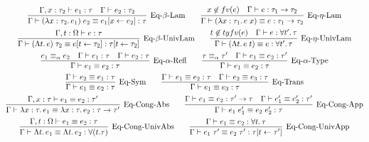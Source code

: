 \begin{gather*}
  \infer[\text{Eq-$\beta$-Lam}]{\Gamma \vdash (\lambda x: \tau_2\ldotp e_1)\; e_2 \equiv e_1[x \assign e_2]: \tau}{
    \Gamma, x: \tau_2 \vdash e_1: \tau
    &
    \Gamma \vdash e_2: \tau_2
  }
  \hspace{2em}
  \infer[\text{Eq-$\eta$-Lam}]{\Gamma \vdash (\lambda x: \tau_1\ldotp e\; x) \equiv e: \tau_1 \to \tau_2}{
    x \not\in \freevar(e)
    &
    \Gamma \vdash e: \tau_1 \to \tau_2
  }
  \\
  \infer[\text{Eq-$\beta$-UnivLam}]{\Gamma \vdash (\Lambda t\ldotp e)\; \tau_2 \equiv e[t \assign \tau_2]: \tau[t \assign \tau_2]}{
    \Gamma, t: \Omega \vdash e: \tau
  }
  \hspace{2em}
  \infer[\text{Eq-$\eta$-UnivLam}]{\Gamma \vdash (\Lambda t\ldotp e\; t) \equiv e: \forall t'\ldotp \tau}{
    t \not\in \typefreevar(e)
    &
    \Gamma \vdash e: \forall t'\ldotp \tau
  }
  \\
  \infer[\text{Eq-$\alpha$-Refl}]{\Gamma \vdash e_1 \equiv e_2: \tau}{
    e_1 \equiv_\alpha e_2
    &
    \Gamma \vdash e_1: \tau
    &
    \Gamma \vdash e_2: \tau
  }
  \hspace{2em}
  \infer[\text{Eq-$\alpha$-Type}]{\Gamma \vdash e_1 \equiv e_2: \tau}{
    \tau \equiv_\alpha \tau'
    &
    \Gamma \vdash e_1 \equiv e_2: \tau'
  }
  \\
  \infer[\text{Eq-Sym}]{\Gamma \vdash e_1 \equiv e_2: \tau}{
    \Gamma \vdash e_2 \equiv e_1: \tau
  }
  \hspace{2em}
  \infer[\text{Eq-Trans}]{\Gamma \vdash e_1 \equiv e_3: \tau}{
    \Gamma \vdash e_1 \equiv e_2: \tau
    &
    \Gamma \vdash e_2 \equiv e_3: \tau
  }
  \\
  \infer[\text{Eq-Cong-Abs}]{\Gamma \vdash \lambda x: \tau\ldotp e_1 \equiv \lambda x: \tau\ldotp e_2: \tau \to \tau'}{
    \Gamma, x: \tau \vdash e_1 \equiv e_2: \tau'
  }
  \hspace{2em}
  \infer[\text{Eq-Cong-App}]{\Gamma \vdash e_1\; e'_1 \equiv e_2\; e'_2: \tau}{
    \Gamma \vdash e_1 \equiv e_2: \tau' \to \tau
    &
    \Gamma \vdash e'_1 \equiv e'_2: \tau'
  }
  \\
  \infer[\text{Eq-Cong-UnivAbs}]{\Gamma \vdash \Lambda t\ldotp e_1 \equiv \Lambda t\ldotp e_2: \forall(t. \tau)}{
    \Gamma, t: \Omega \vdash e_1 \equiv e_2: \tau
  }
  \hspace{2em}
  \infer[\text{Eq-Cong-UnivApp}]{\Gamma \vdash e_1\; \tau' \equiv e_2\; \tau': \tau[t \assign \tau']}{
    \Gamma \vdash e_1 \equiv e_2: \forall t\ldotp \tau
  }
\end{gather*}

